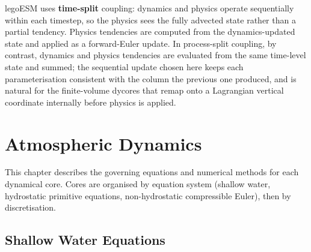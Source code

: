 \documentclass[11pt,twoside]{report}
\begin{document}
legoESM uses \textbf{time-split} coupling: dynamics and physics operate
sequentially within each timestep, so the physics sees the fully advected state
rather than a partial tendency.  Physics tendencies are computed from
the dynamics-updated state and applied as a forward-Euler update.  In
process-split coupling, by contrast, dynamics and physics tendencies are
evaluated from the same time-level state and summed; the sequential update
chosen here keeps each parameterisation consistent with the column the previous
one produced, and is natural for the finite-volume dycores that remap onto a
Lagrangian vertical coordinate internally before physics is applied.


\chapter{Atmospheric Dynamics}
\label{ch:dynamics}

This chapter describes the governing equations and numerical methods for each
dynamical core.  Cores are organised by equation system (shallow water,
hydrostatic primitive equations, non-hydrostatic compressible Euler),
then by discretisation.

\section{Shallow Water Equations}
\label{sec:sw}
\end{document}
